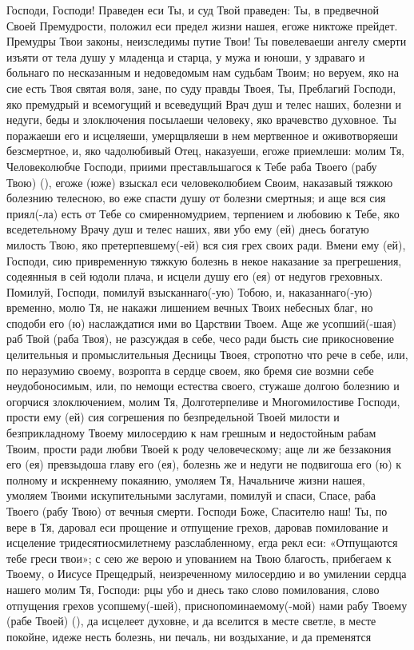 \mychapterending

\begin{mymulticols}
 

Господи, Господи! Праведен еси Ты, и суд Твой праведен: Ты, в предвечной Своей Премудрости, положил еси предел жизни нашея, егоже никтоже прейдет. Премудры Твои законы, неизследимы путие Твои! Ты повелеваеши ангелу смерти изъяти от тела душу у младенца и старца, у мужа и юноши, у здраваго и больнаго по несказанным и недоведомым нам судьбам Твоим; но веруем, яко на сие есть Твоя святая воля, зане, по суду правды Твоея, Ты, Преблагий Господи, яко премудрый и всемогущий и всеведущий Врач душ и телес наших, болезни и недуги, беды и злоключения посылаеши человеку, яко врачевство духовное. Ты поражаеши его и исцеляеши, умерщвляеши в нем мертвенное и оживотворяеши безсмертное, и, яко чадолюбивый Отец, наказуеши, егоже приемлеши: молим Тя, Человеколюбче Господи, приими преставльшагося к Тебе раба Твоего (рабу Твою) (), егоже (юже) взыскал еси человеколюбием Своим, наказавый тяжкою болезнию телесною, во еже спасти душу от болезни смертныя; и аще вся сия приял(-ла) есть от Тебе со смиренномудрием, терпением и любовию к Тебе, яко вседетельному Врачу душ и телес наших, яви убо ему (ей) днесь богатую милость Твою, яко претерпевшему(-ей) вся сия грех своих ради. Вмени ему (ей), Господи, сию привременную тяжкую болезнь в некое наказание за прегрешения, содеянныя в сей юдоли плача, и исцели душу его (ея) от недугов греховных. Помилуй, Господи, помилуй взысканнаго(-ую) Тобою, и, наказаннаго(-ую) временно, молю Тя, не накажи лишением вечных Твоих небесных благ, но сподоби его (ю) наслаждатися ими во Царствии Твоем. Аще же усопший(-шая) раб Твой (раба Твоя), не разсуждая в себе, чесо ради бысть сие прикосновение целительныя и промыслительныя Десницы Твоея, стропотно что рече в себе, или, по неразумию своему, возропта в сердце своем, яко бремя сие возмни себе неудобоносимым, или, по немощи естества своего, стужаше долгою болезнию и огорчися злоключением, молим Тя, Долготерпеливе и Многомилостиве Господи, прости ему (ей) сия согрешения по безпредельной Твоей милости и безприкладному Твоему милосердию к нам грешным и недостойным рабам Твоим, прости ради любви Твоей к роду человеческому; аще ли же беззакония его (ея) превзыдоша главу его (ея), болезнь же и недуги не подвигоша его (ю) к полному и искреннему покаянию, умоляем Тя, Начальниче жизни нашея, умоляем Твоими искупительными заслугами, помилуй и спаси, Спасе, раба Твоего (рабу Твою) от вечныя смерти. Господи Боже, Спасителю наш! Ты, по вере в Тя, даровал еси прощение и отпущение грехов, даровав помилование и исцеление тридесятиосмилетнему разслабленному, егда рекл еси: «Отпущаются тебе греси твои»; с сею же верою и упованием на Твою благость, прибегаем к Твоему, о Иисусе Прещедрый, неизреченному милосердию и во умилении сердца нашего молим Тя, Господи: рцы убо и днесь тако слово помилования, слово отпущения грехов усопшему(-шей), приснопоминаемому(-мой) нами рабу Твоему (рабе Твоей) (), да исцелеет духовне, и да вселится в месте светле, в месте покойне, идеже несть болезнь, ни печаль, ни воздыхание, и да пременятся 
\end{mymulticols}
